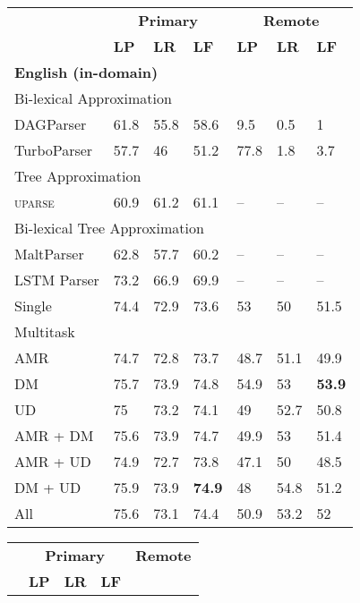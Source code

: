 \documentclass[12pt]{article}
\begin{document}
\begin{table}[t]
\centering
\footnotesize
\setlength\tabcolsep{3pt}
\begin{subfigure}{.475\textwidth}
\begin{tabular}{l|lll|lll}
& \multicolumn{3}{c|}{\bf Primary} & \multicolumn{3}{c}{\bf Remote} \\
& \textbf{LP} & \textbf{LR} & \textbf{LF}
& \textbf{LP} & \textbf{LR} & \textbf{LF} \\
\hline
\multicolumn{4}{l|}{\bf English (in-domain)} \\
\multicolumn{4}{l|}{\rule{0pt}{2ex}
Bi-lexical Approximation} \\
DAGParser
& 61.8 & 55.8 & 58.6 & 9.5 & 0.5 & 1 \\
TurboParser
& 57.7 & 46 & 51.2 & 77.8 & 1.8 & 3.7 \\
\hline
\multicolumn{4}{l|}{\rule{0pt}{2ex}
Tree Approximation} \\
\textsc{uparse}
& 60.9 & 61.2 & 61.1 & -- & -- & -- \\
\hline
\multicolumn{4}{l|}{\rule{0pt}{2ex}
Bi-lexical Tree Approximation} \\
MaltParser
& 62.8 & 57.7 & 60.2 & -- & -- & -- \\
LSTM Parser
& 73.2 & 66.9 & 69.9 & -- & -- & -- \\
\hline
Single
& 74.4 & 72.9 & 73.6 & 53 & 50 & 51.5 \\
Multitask &&& \\
AMR
& 74.7 & 72.8 & 73.7 & 48.7 & 51.1 & 49.9 \\
DM
& 75.7 & 73.9 & 74.8 & 54.9 & 53 & \textbf{53.9} \\
UD
& 75 & 73.2 & 74.1 & 49 & 52.7 & 50.8 \\
AMR + DM
& 75.6 & 73.9 & 74.7 & 49.9 & 53 & 51.4 \\
AMR + UD
& 74.9 & 72.7 & 73.8 & 47.1 & 50 & 48.5 \\
DM + UD
& 75.9 & 73.9 & \textbf{74.9} & 48 & 54.8 & 51.2 \\
All
& 75.6 & 73.1 & 74.4 & 50.9 & 53.2 & 52
\end{tabular}\label{tab:id_results}
\vspace{24.5mm}
\end{subfigure}
\hfill
\begin{subfigure}[t]{.475\textwidth}
\begin{tabular}{l|lll|lll}
& \multicolumn{3}{c|}{\bf Primary} & \multicolumn{3}{c}{\bf Remote} \\
& \textbf{LP} & \textbf{LR} & \textbf{LF}

\end{tabular}
\end{subfigure}
\end{table}
\end{document}
